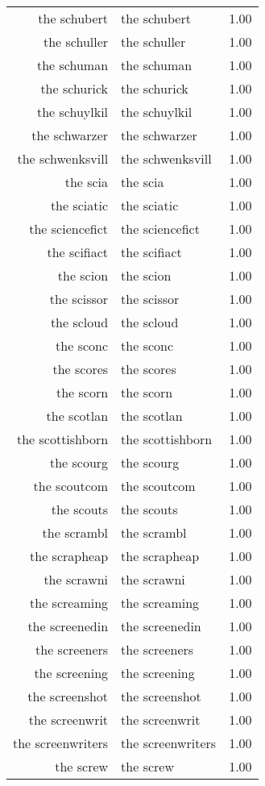 \begin{table}[ht]
\begin{tabular}{rlr}
  the schubert & the schubert & 1.00 \\ 
  the schuller & the schuller & 1.00 \\ 
  the schuman & the schuman & 1.00 \\ 
  the schurick & the schurick & 1.00 \\ 
  the schuylkil & the schuylkil & 1.00 \\ 
  the schwarzer & the schwarzer & 1.00 \\ 
  the schwenksvill & the schwenksvill & 1.00 \\ 
  the scia & the scia & 1.00 \\ 
  the sciatic & the sciatic & 1.00 \\ 
  the sciencefict & the sciencefict & 1.00 \\ 
  the scifiact & the scifiact & 1.00 \\ 
  the scion & the scion & 1.00 \\ 
  the scissor & the scissor & 1.00 \\ 
  the scloud & the scloud & 1.00 \\ 
  the sconc & the sconc & 1.00 \\ 
  the scores & the scores & 1.00 \\ 
  the scorn & the scorn & 1.00 \\ 
  the scotlan & the scotlan & 1.00 \\ 
  the scottishborn & the scottishborn & 1.00 \\ 
  the scourg & the scourg & 1.00 \\ 
  the scoutcom & the scoutcom & 1.00 \\ 
  the scouts & the scouts & 1.00 \\ 
  the scrambl & the scrambl & 1.00 \\ 
  the scrapheap & the scrapheap & 1.00 \\ 
  the scrawni & the scrawni & 1.00 \\ 
  the screaming & the screaming & 1.00 \\ 
  the screenedin & the screenedin & 1.00 \\ 
  the screeners & the screeners & 1.00 \\ 
  the screening & the screening & 1.00 \\ 
  the screenshot & the screenshot & 1.00 \\ 
  the screenwrit & the screenwrit & 1.00 \\ 
  the screenwriters & the screenwriters & 1.00 \\ 
  the screw & the screw & 1.00 \\ 

\end{tabular}
\end{table}
